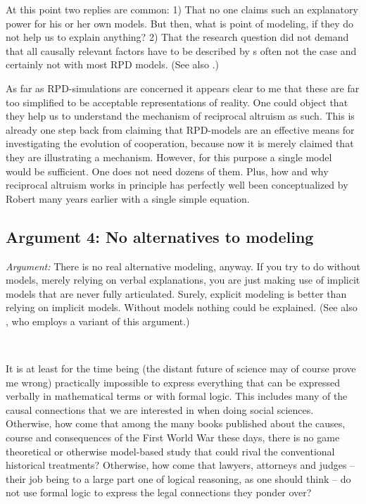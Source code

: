 \documentclass[graybox, English]{svmult}
\begin{document}
At this point two replies are common: 1) That no one claims such an
explanatory power for his or her own models. But then, what is point
of modeling, if they do not help us to explain anything? 2) That the
research question did not demand that all causally relevant
factors have to be described by s often not the case and certainly not
with most RPD models. (See also \citet[367]{arnold:2014b}.)

As far as RPD-simulations are concerned it appears clear to me that
these are far too simplified to be acceptable representations of
reality.  One could object that they help us to understand the
mechanism of reciprocal altruism as such. This is already one step
back from claiming that RPD-models are an effective means for
investigating the evolution of cooperation, because now it is merely
claimed that they are illustrating a mechanism. However, for this
purpose a single model would be sufficient. One does not need dozens
of them. Plus, how and why reciprocal altruism works in principle has
perfectly well been conceptualized by Robert \citet{Trivers1971} many
years earlier with a single simple equation.

\subsection{Argument 4: No alternatives to modeling}

{\em Argument:} There is no real alternative modeling, anyway. If you
try to do without models, merely relying on verbal explanations, you
are just making use of implicit models that are never fully
articulated. Surely, explicit modeling is better than relying on
implicit models. Without models nothing could be explained.
(See also \citet{epstein:2008}, who employs a variant of this argument.)

\

 It is at least for the time being (the
distant future of science may of course prove me wrong) practically
impossible to express everything that can be expressed verbally in
mathematical terms or with formal logic. This includes many of the
causal connections that we are interested in when doing social
sciences. Otherwise, how come that among the many books published
about the causes, course and consequences of the First World War these
days, there is no game theoretical or otherwise model-based study that
could rival the conventional historical treatments? Otherwise, how
come that lawyers, attorneys and judges -- their job being to a large
part one of logical reasoning, as one should think -- do not use formal logic to express
the legal connections they ponder over?
\end{document}
